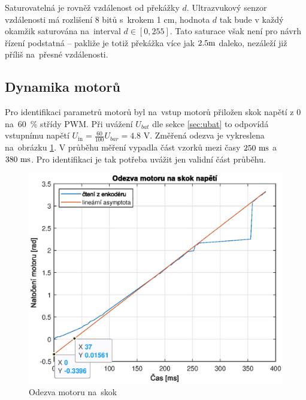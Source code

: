 \documentclass[conference]{IEEEtran}
\begin{document}
Saturovatelná je rovněž vzdálenost od překážky $d$. Ultrazvukový senzor vzdálenosti má rozlišení 8 bitů s~krokem 1 \si{\centi\metre},
hodnota $d$ tak bude v každý okamžik saturována na~interval $d \in \left[0, 255\right]$. Tato saturace však není pro návrh řízení podstatná --
pakliže je totiž překážka více jak $2.5 \text{\si{\metre}}$ daleko, nezáleží již příliš na~přesné vzdálenosti.

\subsection{Dynamika motorů}

Pro identifikaci parametrů motorů byl na~vstup motorů přiložen skok napětí z $0$ na~$60$~\% střídy PWM.
Při uvážení $U_{bat}$ dle sekce \ref{sec:ubat} to odpovídá vstupnímu napětí $U_\text{in} = \frac{60}{100} U_{bar} = 4.8$ \si{\volt}.
Změřená odezva je vykreslena na~obrázku \ref{fig:motor_skok}. V průběhu měření vypadla část vzorků mezi časy $250~\text{\si{\milli\second}}$ 
a~$380~\text{\si{\milli\second}}$. Pro identifikaci je tak potřeba uvážit jen validní část průběhu.

\begin{figure}[htbp]
    \centerline{\includegraphics[width=\linewidth]{motor_skok.eps}}
    \caption{Odezva motoru na~skok}
    \label{fig:motor_skok}        
\end{figure}
\end{document}
